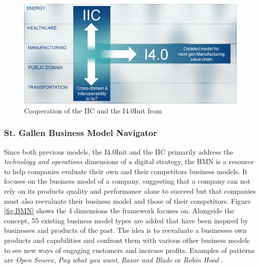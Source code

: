 \begin{figure}[H]
\centering
\includegraphics[width=1\columnwidth]{images/iici40}
\caption{Cooperation of the \ac{IIC} and the \ac{I4.0Init} from \citeauthor{iic-progress:2016}}
\end{figure}


\subsubsection{St. Gallen Business Model Navigator}

Since both previous models, the  \ac{I4.0Init} and  the \ac{IIC} primarily address the \emph{technology and operations} dimensions of a digital strategy, the \ac{BMN} is a resource to help companies evaluate their own and their competitors business models. It focuses on the business model of a company, suggesting that a company can not rely on its products quality and performance alone to succeed but that companies must also reevaluate their business model and those of their competitors. Figure \ref{fig:BMN} shows the 4 dimensions the framework focuses on. Alongside the concept, 55 existing business model types are added that have been inspired by businesses and products of the past. The idea is to reevaluate a businesses own products and capabilities and confront them with various other business models to see new ways of engaging customers and increase profits. Examples of patterns are \emph{Open Source}, \emph{Pay what you want}, \emph{Razor and Blade} or \emph{Robin Hood} \cite{gassmann:gallen:2013geschaeftsmodelle}.

